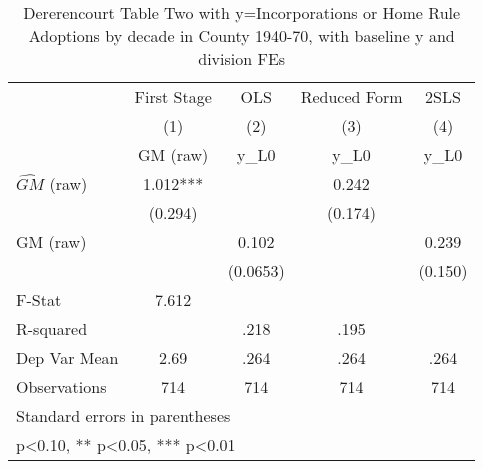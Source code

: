 \begin{table}[htbp]\centering
\def\sym#1{\ifmmode^{#1}\else\(^{#1}\)\fi}
\caption{Dererencourt Table Two with y=Incorporations or Home Rule Adoptions by decade in County 1940-70, with baseline y and division FEs}
\begin{tabular}{l*{4}{c}}
\toprule
                    & First Stage   &         OLS   &Reduced Form   &        2SLS   \\
                    &\multicolumn{1}{c}{(1)}&\multicolumn{1}{c}{(2)}&\multicolumn{1}{c}{(3)}&\multicolumn{1}{c}{(4)}\\
                    &\multicolumn{1}{c}{GM  (raw)}&\multicolumn{1}{c}{y\_L0}&\multicolumn{1}{c}{y\_L0}&\multicolumn{1}{c}{y\_L0}\\
\midrule
$\hat{GM}$ (raw)    &       1.012***&               &       0.242   &               \\
                    &     (0.294)   &               &     (0.174)   &               \\
\addlinespace
GM  (raw)           &               &       0.102   &               &       0.239   \\
                    &               &    (0.0653)   &               &     (0.150)   \\
\midrule
F-Stat              &       7.612   &               &               &               \\
R-squared           &               &        .218   &        .195   &               \\
Dep Var Mean        &        2.69   &        .264   &        .264   &        .264   \\
Observations        &         714   &         714   &         714   &         714   \\
\bottomrule
\multicolumn{5}{l}{\footnotesize Standard errors in parentheses}\\
\multicolumn{5}{l}{\footnotesize * p<0.10, ** p<0.05, *** p<0.01}\\
\end{tabular}
\end{table}
